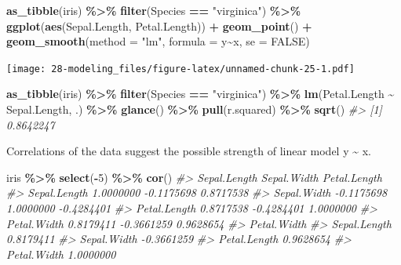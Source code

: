 \documentclass[
  xelatex, ja=standard]{bxjsbook}
\newenvironment{Shaded}{\begin{snugshade}}{\end{snugshade}}
\newcommand{\AttributeTok}[1]{\textcolor[rgb]{0.13,0.29,0.53}{#1}}
\newcommand{\CommentTok}[1]{\textcolor[rgb]{0.56,0.35,0.01}{\textit{#1}}}
\newcommand{\ConstantTok}[1]{\textcolor[rgb]{0.56,0.35,0.01}{#1}}
\newcommand{\DecValTok}[1]{\textcolor[rgb]{0.00,0.00,0.81}{#1}}
\newcommand{\FunctionTok}[1]{\textcolor[rgb]{0.13,0.29,0.53}{\textbf{#1}}}
\newcommand{\NormalTok}[1]{#1}
\newcommand{\SpecialCharTok}[1]{\textcolor[rgb]{0.81,0.36,0.00}{\textbf{#1}}}
\newcommand{\StringTok}[1]{\textcolor[rgb]{0.31,0.60,0.02}{#1}}
\theoremstyle{definition}
\theoremstyle{definition}
\theoremstyle{definition}
\theoremstyle{definition}
\theoremstyle{remark}
\begin{document}
\begin{Shaded}
\begin{Highlighting}[]
\FunctionTok{as\_tibble}\NormalTok{(iris) }\SpecialCharTok{\%\textgreater{}\%} \FunctionTok{filter}\NormalTok{(Species }\SpecialCharTok{==} \StringTok{"virginica"}\NormalTok{) }\SpecialCharTok{\%\textgreater{}\%} \FunctionTok{ggplot}\NormalTok{(}\FunctionTok{aes}\NormalTok{(Sepal.Length, Petal.Length)) }\SpecialCharTok{+} \FunctionTok{geom\_point}\NormalTok{() }\SpecialCharTok{+} \FunctionTok{geom\_smooth}\NormalTok{(}\AttributeTok{method =} \StringTok{"lm"}\NormalTok{, }\AttributeTok{formula =}\NormalTok{ y}\SpecialCharTok{\textasciitilde{}}\NormalTok{x, }\AttributeTok{se =} \ConstantTok{FALSE}\NormalTok{)}
\end{Highlighting}
\end{Shaded}

\texttt{[image: 28-modeling\_files/figure-latex/unnamed-chunk-25-1.pdf]}

\begin{Shaded}
\begin{Highlighting}[]
\FunctionTok{as\_tibble}\NormalTok{(iris) }\SpecialCharTok{\%\textgreater{}\%} \FunctionTok{filter}\NormalTok{(Species }\SpecialCharTok{==} \StringTok{"virginica"}\NormalTok{) }\SpecialCharTok{\%\textgreater{}\%} \FunctionTok{lm}\NormalTok{(Petal.Length }\SpecialCharTok{\textasciitilde{}}\NormalTok{ Sepal.Length, .) }\SpecialCharTok{\%\textgreater{}\%} \FunctionTok{glance}\NormalTok{() }\SpecialCharTok{\%\textgreater{}\%} \FunctionTok{pull}\NormalTok{(r.squared) }\SpecialCharTok{\%\textgreater{}\%} \FunctionTok{sqrt}\NormalTok{()}
\CommentTok{\#\textgreater{} [1] 0.8642247}
\end{Highlighting}
\end{Shaded}

Correlations of the data suggest the possible strength of linear model y \textasciitilde{} x.

\begin{Shaded}
\begin{Highlighting}[]
\NormalTok{iris }\SpecialCharTok{\%\textgreater{}\%} \FunctionTok{select}\NormalTok{(}\SpecialCharTok{{-}}\DecValTok{5}\NormalTok{) }\SpecialCharTok{\%\textgreater{}\%} \FunctionTok{cor}\NormalTok{()}
\CommentTok{\#\textgreater{}              Sepal.Length Sepal.Width Petal.Length}
\CommentTok{\#\textgreater{} Sepal.Length    1.0000000  {-}0.1175698    0.8717538}
\CommentTok{\#\textgreater{} Sepal.Width    {-}0.1175698   1.0000000   {-}0.4284401}
\CommentTok{\#\textgreater{} Petal.Length    0.8717538  {-}0.4284401    1.0000000}
\CommentTok{\#\textgreater{} Petal.Width     0.8179411  {-}0.3661259    0.9628654}
\CommentTok{\#\textgreater{}              Petal.Width}
\CommentTok{\#\textgreater{} Sepal.Length   0.8179411}
\CommentTok{\#\textgreater{} Sepal.Width   {-}0.3661259}
\CommentTok{\#\textgreater{} Petal.Length   0.9628654}
\CommentTok{\#\textgreater{} Petal.Width    1.0000000}
\end{Highlighting}
\end{Shaded}
\end{document}
